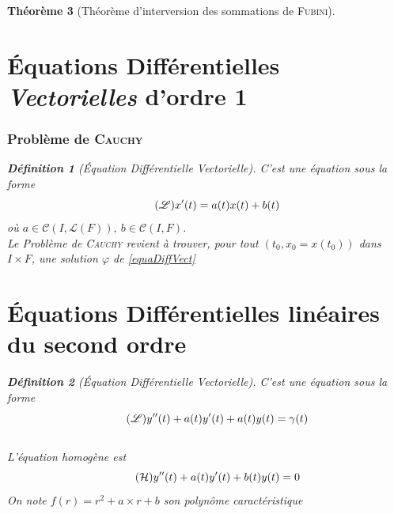 \documentclass[11pt,a4paper]{report}
\newtheorem{theorem}{Théorème}[chapter]
\theoremstyle{definition}
\newtheorem{dfn}[theorem]{Définition}
\begin{document}
\begin{theorem}[Théorème d'interversion des sommations de \textsc{Fubini}]
{{\section{Équations Différentielles \emph{Vectorielles} d'ordre 1}
\subsubsection{Problème de \textsc{Cauchy}} %
\label{ssub:probleme_de_Cauchy}
\begin{dfn}[Équation Différentielle Vectorielle]
    C'est une équation sous la forme 
\begin{equation}\label{equaDiffVect}\tag{$\mathscr{L}$}
    x'(t) = a(t) x(t) + b(t)
\end{equation}
où $a \in \mathcal{C}\left( I,\mathscr{L}(F)\right), \: b\in \mathcal{C}(I,F)$. \\Le \emph{Problème de \textsc{Cauchy}}  revient à trouver, pour tout $(t_0,x_0=x(t_0))$ dans $I \times F$, une solution $\varphi$ de \eqref{equaDiffVect}
\end{dfn}

\section{Équations Différentielles linéaires du second ordre}

\begin{dfn}[Équation Différentielle Vectorielle]
    C'est une équation sous la forme 
\begin{equation}\label{eq:equaDiff2ndOrdre}\tag{$\mathscr{L}$}
    y''(t) + a(t) y'(t) + a(t)y(t)= \gamma (t)
\end{equation}
\hfill \\[0.5\baselineskip]
    L'équation homogène est
\begin{equation}\label{eq:equaDiff2ndOrdreHomogene}\tag{$\mathcal{H}$}
    y''(t) + a(t) y'(t) + b(t)y(t)= 0
\end{equation}
On note $f(r) = r^2 + a\times r + b$ %
son polynôme caractéristique
\end{dfn}
}}
\end{theorem}
\end{document}
